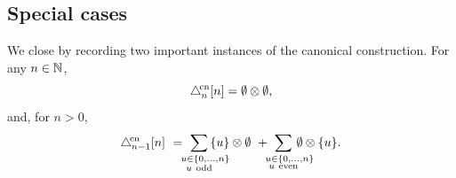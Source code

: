 \subsection{Special cases}\label{ss:canonical_special_cases}

We close by recording two important instances of the canonical construction.
For any $n \in \mathbb{N}$,
\[
\triangle^{\!\mathrm{cn}}_n[n] = \emptyset \otimes \emptyset,
\]
and, for $n > 0$,
\[
\canonical_{n-1} [n] \ = \
\sum_{\mathclap{\substack{\quad u \in \{0,\dots,n\} \\ u \ \mathrm{odd}}}} \,\{u\} \ot \emptyset \ + \
\sum_{\mathclap{\substack{\quad u \in \{0,\dots,n\} \\ u \ \mathrm{even}}}} \,\emptyset \ot \{u\}.
\]
